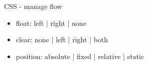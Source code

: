 \begin{frame}{CSS - manage flow}
 \begin{center}
 \begin{itemize}
 \footnotesize
 \item float: left | right | none
 \item clear: none | left | right | both
 \item position: absolute | fixed | relative | static
 \end{itemize}
 \end{center}
\end{frame}